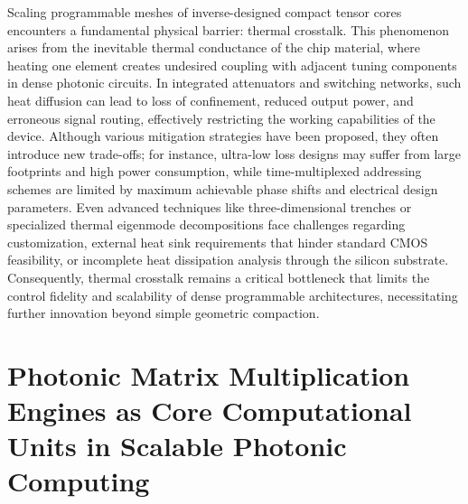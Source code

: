 \documentclass[11pt]{article}
\begin{document}
Scaling programmable meshes of inverse-designed compact tensor cores encounters a fundamental physical barrier: thermal crosstalk. \citep{doi_10_1109_access_2020_3013116_8fec1fb2} This phenomenon arises from the inevitable thermal conductance of the chip material, where heating one element creates undesired coupling with adjacent tuning components in dense photonic circuits. In integrated attenuators and switching networks, such heat diffusion can lead to loss of confinement, reduced output power, and erroneous signal routing, effectively restricting the working capabilities of the device. Although various mitigation strategies have been proposed, they often introduce new trade-offs; for instance, ultra-low loss designs may suffer from large footprints and high power consumption, while time-multiplexed addressing schemes are limited by maximum achievable phase shifts and electrical design parameters. Even advanced techniques like three-dimensional trenches or specialized thermal eigenmode decompositions face challenges regarding customization, external heat sink requirements that hinder standard CMOS feasibility, or incomplete heat dissipation analysis through the silicon substrate. Consequently, thermal crosstalk remains a critical bottleneck that limits the control fidelity and scalability of dense programmable architectures, necessitating further innovation beyond simple geometric compaction. \citep{doi_10_1109_access_2020_3013116_8fec1fb2}

\section{Photonic Matrix Multiplication Engines as Core Computational Units in Scalable Photonic Computing}\label{photonic-matrix-multiplication-engines-as-core-computational-units-in-scalable-photonic-computing}
\end{document}
